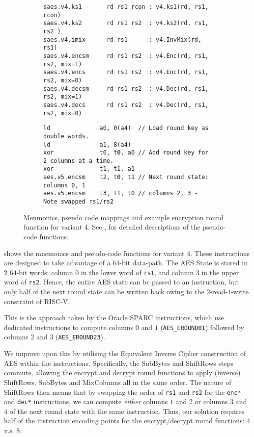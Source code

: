 
\begin{figure}
\begin{subfigure}{\textwidth}
\begin{lstlisting}[language=pseudo,style=block]
saes.v4.ks1       rd rs1 rcon : v4.ks1(rd, rs1, rcon)
saes.v4.ks2       rd rs1 rs2  : v4.ks2(rd, rs1, rs2 )
saes.v4.imix      rd rs1      : v4.InvMix(rd, rs1)
saes.v4.encsm     rd rs1 rs2  : v4.Enc(rd, rs1, rs2, mix=1)
saes.v4.encs      rd rs1 rs2  : v4.Enc(rd, rs1, rs2, mix=0)
saes.v4.decsm     rd rs1 rs2  : v4.Dec(rd, rs1, rs2, mix=1)
saes.v4.decs      rd rs1 rs2  : v4.Dec(rd, rs1, rs2, mix=0)
\end{lstlisting}
\caption{
}
\label{fig:mnemonics:v4}
\end{subfigure}
\begin{subfigure}{\textwidth}
\begin{lstlisting}[language=pseudo,style=block]
ld              a0, 0(a4)  // Load round key as double words.
ld              a1, 8(a4)
xor             t0, t0, a0 // Add round key for 2 columns at a time.
xor             t1, t1, a1
aes.v5.encsm    t2, t0, t1 // Next round state: columns 0, 1
aes.v5.encsm    t3, t1, t0 // columns 2, 3 - Note swapped rs1/rs2
\end{lstlisting}
\caption{
}
\label{fig:round:v4}
\end{subfigure}
\caption{
    Menmonics, pseudo code mappings and example encryption
    round function for variant 4.
    See ,  for detailed
    descriptions of the pseudo-code functions.
}
\end{figure}

 shows the mnemonics and pseudo-code functions
for variant 4.
These instructions are designed to take advantage of a 64-bit
data-path.
The AES State is stored in $2$ $64$-bit words: column $0$ in the
lower word of {\tt rs1}, and column $3$ in the upper word of {\tt rs2}.
Hence, the entire AES state can be passed to an instruction, but only
half of the next round state can be written back owing to the
$2$-read-$1$-write constraint of RISC-V.

This is the approach taken by the Oracle SPARC \cite[Page 109]{SPARC:16}
instructions, which use dedicated instructions to compute
columns $0$ and $1$ ({\tt AES\_EROUND01}) followed by
columns $2$ and $3$ ({\tt AES\_EROUND23}).

We improve upon this by utilising the Equivalent Inverse Cipher
construction of AES \cite[Section 5.4.4, Page 27]{FIPS:197} within
the instructions.
Specifically, the SubBytes and ShiftRows steps commute, allowing
the encrypt and decrypt round functions to apply (inverse)
ShiftRows, SubBytes and MixColumns all in the same order.
The nature of ShiftRows then means that by
swapping the order of {\tt rs1} and {\tt rs2}
for the {\tt enc*} and {\tt dec*} instructions, we can compute {\em either}
columns $1$ and $2$ or columns $3$ and $4$ of the next round state with the
same instruction.
Thus, our solution requires half of the instruction encoding points
for the encrypt/decrypt round functions: $4$ v.s. $8$.

